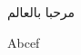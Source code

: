 \documentclass[12pt]{article}
\begin{document}
\begin{arab}[utf]
مرحبا بالعالم
\end{arab}
Abcef
\end{document}
